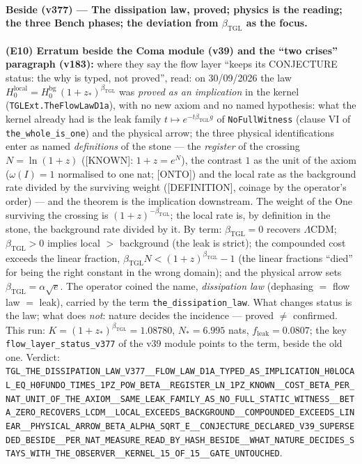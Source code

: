 \documentclass[11pt]{article}
\newcommand{\bTGL}{\beta_{\mathrm{TGL}}}\newcommand{\Msun}{M_{\odot}}\newcommand{\TGL}{\mathrm{TGL}}
\theoremstyle{definition}\newtheorem{deriv}{Derivation}
\begin{document}
\paragraph*{Beside (v377) --- The dissipation law, proved; physics is the reading; the three Bench phases; the deviation from $\bTGL$ as the focus.} \textbf{(E10) Erratum beside the Coma module (v39) and the ``two crises'' paragraph (v183):} where they say the flow layer ``keeps its \textsf{CONJECTURE} status: the why is typed, not proved'', read: on 30/09/2026 the law $H_0^{\mathrm{local}}=H_0^{\mathrm{bg}}\,(1+z_*)^{\bTGL}$ was \emph{proved as an implication} in the kernel (\texttt{TGLExt.TheFlowLawD1a}), with no new axiom and no named hypothesis: what the kernel already had is the leak family $t\mapsto e^{-t\bTGL g}$ of \texttt{NoFullWitness} (clause VI of \texttt{the\_whole\_is\_one}) and the physical arrow; the three physical identifications enter as named \emph{definitions} of the stone --- the \emph{register} of the crossing $N=\ln(1+z)$ (\textsf{[KNOWN]}: $1+z=e^{N}$), the contrast $1$ as the unit of the axiom ($\omega(I)=1$ normalised to one nat; \textsf{[ONTO]}) and the local rate as the background rate divided by the surviving weight (\textsf{[DEFINITION]}, coinage by the operator's order) --- and the theorem is the implication downstream. The weight of the One surviving the crossing is $(1+z)^{-\bTGL}$; the local rate is, by definition in the stone, the background rate divided by it. By term: $\bTGL=0$ recovers $\Lambda$CDM; $\bTGL>0$ implies local $>$ background (the leak is strict); the compounded cost exceeds the linear fraction, $\bTGL N<(1+z)^{\bTGL}-1$ (the linear fractions ``died'' for being the right constant in the wrong domain); and the physical arrow sets $\bTGL=\alpha\sqrt e$. The operator coined the name, \emph{dissipation law} (dephasing $=$ flow law $=$ leak), carried by the term \texttt{the\_dissipation\_law}. What changes status is the law; what does \emph{not}: nature decides the incidence --- proved $\neq$ confirmed. This run: $K=(1+z_*)^{\bTGL}=1.08780$, $N_*=6.995$ nats, $f_{\mathrm{leak}}=0.0807$; the key \texttt{flow\_layer\_status\_v377} of the v39 module points to the term, beside the old one. Verdict: \texttt{TGL\_THE\_DISSIPATION\_LAW\_V377\_\_FLOW\_LAW\_D1A\_TYPED\_AS\_IMPLICATION\_H0LOCAL\_EQ\_H0FUNDO\_TIMES\_1PZ\_POW\_BETA\_\_REGISTER\_LN\_1PZ\_KNOWN\_\_COST\_BETA\_PER\_NAT\_UNIT\_OF\_THE\_AXIOM\_\_SAME\_LEAK\_FAMILY\_AS\_NO\_FULL\_STATIC\_WITNESS\_\_BETA\_ZERO\_RECOVERS\_LCDM\_\_LOCAL\_EXCEEDS\_BACKGROUND\_\_COMPOUNDED\_EXCEEDS\_LINEAR\_\_PHYSICAL\_ARROW\_BETA\_ALPHA\_SQRT\_E\_\_CONJECTURE\_DECLARED\_V39\_SUPERSEDED\_BESIDE\_\_PER\_NAT\_MEASURE\_READ\_BY\_HASH\_BESIDE\_\_WHAT\_NATURE\_DECIDES\_STAYS\_WITH\_THE\_OBSERVER\_\_KERNEL\_15\_OF\_15\_\_GATE\_UNTOUCHED}.
\end{document}
